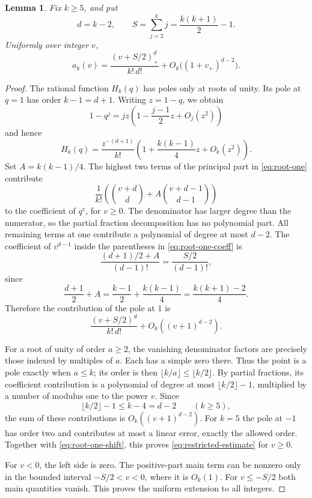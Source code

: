 \documentclass[3p,11pt,number]{elsarticle}
\newtheorem{lemma}[theorem]{Lemma}
\theoremstyle{remark}
\numberwithin{equation}{section}
\begin{document}
\begin{lemma}\label{lem:restricted}
Fix \(k\ge5\), and put
\[
d=k-2,\qquad S=\sum_{j=2}^{k}j=\frac{k(k+1)}2-1.
\]
Uniformly over integer \(v\),
\begin{equation}\label{eq:restricted-estimate}
a_k(v)=\frac{(v+S/2)_+^d}{k!\,d!}
+O_k\bigl((1+v_+)^{d-2}\bigr).
\end{equation}
\end{lemma}

\begin{proof}
The rational function \(H_k(q)\) has poles only at roots of unity.
Its pole at \(q=1\) has order \(k-1=d+1\).
Writing \(z=1-q\), we obtain
\[
1-q^j=jz\left(1-\frac{j-1}{2}z+O_j(z^2)\right)
\]
and hence
\begin{equation}\label{eq:root-one}
H_k(q)=\frac{z^{-(d+1)}}{k!}
\left(1+\frac{k(k-1)}4z+O_k(z^2)\right).
\end{equation}
Set \(A=k(k-1)/4\). The highest two terms of the principal part in
\eqref{eq:root-one} contribute
\begin{equation}\label{eq:root-one-coeff}
\frac1{k!}
\left(\binom{v+d}{d}
+A\binom{v+d-1}{d-1}\right)
\end{equation}
to the coefficient of \(q^v\), for \(v\ge0\).
The denominator has larger degree than the numerator, so the partial
fraction decomposition has no polynomial part. All remaining terms at one contribute a polynomial
of degree at most \(d-2\).
The coefficient of \(v^{d-1}\) inside the parentheses in
\eqref{eq:root-one-coeff} is
\[
\frac{(d+1)/2+A}{(d-1)!}
=\frac{S/2}{(d-1)!},
\]
since
\[
\frac{d+1}{2}+A
=\frac{k-1}{2}+\frac{k(k-1)}4
=\frac{k(k+1)-2}{4}.
\]
Therefore the contribution of the pole at \(1\) is
\begin{equation}\label{eq:root-one-shift}
\frac{(v+S/2)^d}{k!\,d!}
+O_k((v+1)^{d-2}).
\end{equation}

For a root of unity of order \(a\ge2\), the vanishing denominator
factors are precisely those indexed by multiples of \(a\). Each has
a simple zero there. Thus the point is a pole exactly when \(a\le k\);
its order is then \(\lfloor k/a\rfloor\le\lfloor k/2\rfloor\).
By partial fractions, its coefficient contribution is a polynomial
of degree at most \(\lfloor k/2\rfloor-1\), multiplied by a number
of modulus one to the power \(v\).
Since
\[
\lfloor k/2\rfloor-1\le k-4=d-2
\qquad(k\ge5),
\]
the sum of these contributions is \(O_k((v+1)^{d-2})\).
For \(k=5\) the pole at \(-1\) has order two and contributes at most a linear error, exactly the allowed order.
Together with \eqref{eq:root-one-shift}, this proves
\eqref{eq:restricted-estimate} for \(v\ge0\).

For \(v<0\), the left side is zero.
The positive-part main term can be nonzero only in the bounded
interval \(-S/2<v<0\), where it is \(O_k(1)\).
For \(v\le-S/2\) both main quantities vanish.
This proves the uniform extension to all integers.
\end{proof}
\end{document}
